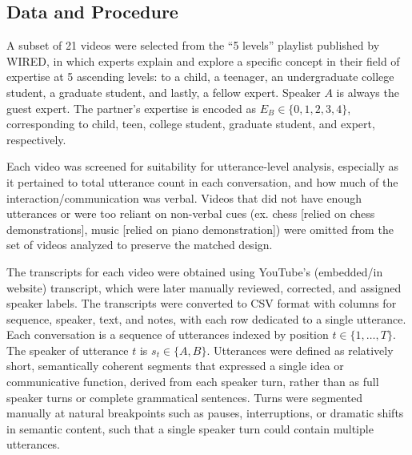 \documentclass{article}
\begin{document}
\subsection{Data and Procedure}

A subset of 21 videos were selected from the “5 levels” playlist published by WIRED,  in which experts explain and explore a specific concept in their field of expertise at 5 ascending levels: to a child, a teenager, an undergraduate college student, a graduate student, and lastly, a fellow expert. Speaker $A$ is always the guest expert. The partner's expertise is encoded as $E_B \in \{0,1,2,3,4\}$, corresponding to child, teen, college student, graduate student, and expert, respectively.

Each video was screened for suitability for utterance-level analysis, especially as it pertained to total utterance count in each conversation, and how much of the interaction/communication was verbal. Videos that did not have enough utterances or were too reliant on non-verbal cues (ex. chess [relied on chess demonstrations], music [relied on piano demonstration]) were omitted from the set of videos analyzed to preserve the matched design.

The transcripts for each video were obtained using YouTube’s (embedded/in website) transcript, which were later manually reviewed, corrected, and assigned speaker labels. The transcripts were converted to CSV format with columns for sequence, speaker, text, and notes, with each row dedicated to a single utterance. Each conversation is a sequence of utterances indexed by position $t \in \{1,\ldots,T\}$. The speaker of utterance $t$ is $s_t \in \{A,B\}$. Utterances were defined as relatively short, semantically coherent segments that expressed a single idea or communicative function, derived from each speaker turn, rather than as full speaker turns or complete grammatical sentences. Turns were segmented manually at natural breakpoints such as pauses, interruptions, or dramatic shifts in semantic content, such that a single speaker turn could contain multiple utterances.
\end{document}

